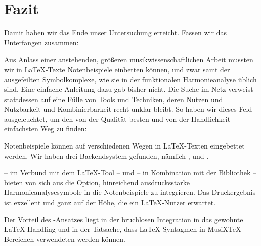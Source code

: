 %
%
%




\chapter{Fazit}

Damit haben wir das Ende unser Untersuchung erreicht. Fassen wir das Unterfangen
zusammen:

Aus Anlass einer anstehenden, größeren musikwissenschaftlichen Arbeit mussten
wir in \LaTeX-Texte Notenbeispiele einbetten können, und zwar samt der
ausgefeilten Symbolkomplexe, wie sie in der funktionalen Harmonieanalyse üblich
sind. Eine einfache Anleitung dazu gab bisher nicht. Die Suche im Netz verweist
stattdessen auf eine Fülle von Tools und Techniken, deren Nutzen und Nutzbarkeit
und Kombinierbarkeit recht unklar bleibt. So haben wir dieses Feld
ausgeleuchtet, um den von der Qualität besten und von der Handlichkeit
einfachsten Weg zu finden:

Notenbeispiele können auf verschiedenen Wegen in \LaTeX-Texten eingebettet
werden. Wir haben drei Backendsystem gefunden, nämlich
,  und
.

 -- im Verbund mit dem \LaTeX-Tool  --
und  -- in Kombination mit der 
Bibliothek  -- bieten von sich aus die Option, hinreichend
ausdrucksstarke Harmonieanalysesymbole in die Notenbeispiele zu integrieren.
Das Druckergebnis ist exzellent und ganz auf der Höhe, die ein \LaTeX-Nutzer
erwartet.

Der Vorteil des -Ansatzes liegt in der bruchlosen
Integration in das gewohnte \LaTeX-Handling und in der Tatsache, dass
\LaTeX-Syntagmen in MusiX\TeX-Bereichen verwendeten werden können.

